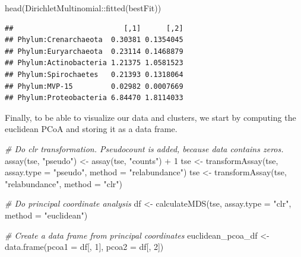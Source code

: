 \documentclass[
]{book}
\newenvironment{Shaded}{\begin{snugshade}}{\end{snugshade}}
\newcommand{\AttributeTok}[1]{\textcolor[rgb]{0.77,0.63,0.00}{#1}}
\newcommand{\CommentTok}[1]{\textcolor[rgb]{0.56,0.35,0.01}{\textit{#1}}}
\newcommand{\DecValTok}[1]{\textcolor[rgb]{0.00,0.00,0.81}{#1}}
\newcommand{\FunctionTok}[1]{\textcolor[rgb]{0.00,0.00,0.00}{#1}}
\newcommand{\NormalTok}[1]{#1}
\newcommand{\OtherTok}[1]{\textcolor[rgb]{0.56,0.35,0.01}{#1}}
\newcommand{\SpecialCharTok}[1]{\textcolor[rgb]{0.00,0.00,0.00}{#1}}
\newcommand{\StringTok}[1]{\textcolor[rgb]{0.31,0.60,0.02}{#1}}
\begin{document}
\begin{Shaded}
\begin{Highlighting}[]
\FunctionTok{head}\NormalTok{(DirichletMultinomial}\SpecialCharTok{::}\FunctionTok{fitted}\NormalTok{(bestFit))}
\end{Highlighting}
\end{Shaded}

\begin{verbatim}
##                          [,1]      [,2]
## Phylum:Crenarchaeota  0.30381 0.1354045
## Phylum:Euryarchaeota  0.23114 0.1468879
## Phylum:Actinobacteria 1.21375 1.0581523
## Phylum:Spirochaetes   0.21393 0.1318064
## Phylum:MVP-15         0.02982 0.0007669
## Phylum:Proteobacteria 6.84470 1.8114033
\end{verbatim}

Finally, to be able to visualize our data and clusters, we start by
computing the euclidean PCoA and storing it as a data frame.

\begin{Shaded}
\begin{Highlighting}[]
\CommentTok{\# Do clr transformation. Pseudocount is added, because data contains zeros.}
\FunctionTok{assay}\NormalTok{(tse, }\StringTok{"pseudo"}\NormalTok{) }\OtherTok{\textless{}{-}} \FunctionTok{assay}\NormalTok{(tse, }\StringTok{"counts"}\NormalTok{) }\SpecialCharTok{+} \DecValTok{1}
\NormalTok{tse }\OtherTok{\textless{}{-}} \FunctionTok{transformAssay}\NormalTok{(tse, }\AttributeTok{assay.type =} \StringTok{"pseudo"}\NormalTok{, }\AttributeTok{method =} \StringTok{"relabundance"}\NormalTok{)}
\NormalTok{tse }\OtherTok{\textless{}{-}} \FunctionTok{transformAssay}\NormalTok{(tse, }\StringTok{"relabundance"}\NormalTok{, }\AttributeTok{method =} \StringTok{"clr"}\NormalTok{)}

\CommentTok{\# Do principal coordinate analysis}
\NormalTok{df }\OtherTok{\textless{}{-}} \FunctionTok{calculateMDS}\NormalTok{(tse, }\AttributeTok{assay.type =} \StringTok{"clr"}\NormalTok{, }\AttributeTok{method =} \StringTok{"euclidean"}\NormalTok{)}

\CommentTok{\# Create a data frame from principal coordinates}
\NormalTok{euclidean\_pcoa\_df }\OtherTok{\textless{}{-}} \FunctionTok{data.frame}\NormalTok{(}\AttributeTok{pcoa1 =}\NormalTok{ df[, }\DecValTok{1}\NormalTok{], }\AttributeTok{pcoa2 =}\NormalTok{ df[, }\DecValTok{2}\NormalTok{])}
\end{Highlighting}
\end{Shaded}
\end{document}
